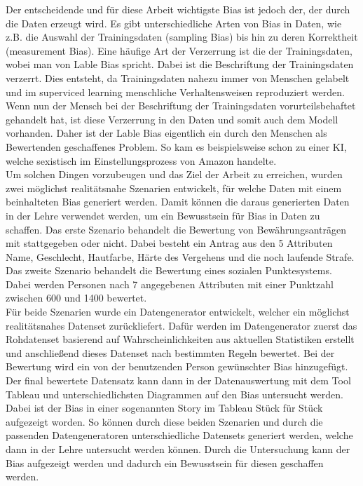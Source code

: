 \begin{onehalfspace}
Der entscheidende und für diese Arbeit wichtigste Bias ist jedoch der, der durch die Daten erzeugt wird. Es gibt unterschiedliche Arten von Bias in Daten, wie z.B. die Auswahl der Trainingsdaten (sampling Bias) bis hin zu deren Korrektheit (measurement Bias). Eine häufige Art der Verzerrung ist die der Trainingsdaten, wobei man von Lable Bias spricht. Dabei ist die Beschriftung der Trainingsdaten verzerrt. Dies entsteht, da Trainingsdaten nahezu immer von Menschen \glqq{}gelabelt\grqq{} und im superviced learning menschliche Verhaltensweisen reproduziert werden. Wenn nun der Mensch bei der Beschriftung der Trainingsdaten vorurteilsbehaftet gehandelt hat, ist diese Verzerrung in den Daten und somit auch dem Modell vorhanden. Daher ist der Lable Bias eigentlich ein durch den Menschen als Bewertenden geschaffenes Problem. So kam es beispielsweise schon zu einer KI, welche sexistisch im Einstellungsprozess von Amazon handelte.\\
Um solchen Dingen vorzubeugen und das Ziel der Arbeit zu erreichen, wurden zwei möglichst realitätsnahe Szenarien entwickelt, für welche Daten mit einem beinhalteten Bias generiert werden. Damit können die daraus generierten Daten in der Lehre verwendet werden, um ein Bewusstsein für Bias in Daten zu schaffen. Das erste Szenario behandelt die Bewertung von Bewährungsanträgen mit stattgegeben oder nicht. Dabei besteht ein Antrag aus den 5 Attributen Name, Geschlecht, Hautfarbe, Härte des Vergehens und die noch laufende Strafe. Das zweite Szenario behandelt die Bewertung eines sozialen Punktesystems. Dabei werden Personen nach 7 angegebenen Attributen mit einer Punktzahl zwischen 600 und 1400 bewertet.\\
Für beide Szenarien wurde ein Datengenerator entwickelt, welcher ein möglichst realitätsnahes Datenset zurückliefert. Dafür werden im Datengenerator zuerst das Rohdatenset basierend auf Wahrscheinlichkeiten aus aktuellen Statistiken erstellt und anschließend dieses Datenset nach bestimmten Regeln bewertet. Bei der Bewertung wird ein von der benutzenden Person gewünschter Bias hinzugefügt. Der final bewertete Datensatz kann dann in der Datenauswertung mit dem Tool Tableau und unterschiedlichsten Diagrammen auf den Bias untersucht werden. Dabei ist der Bias in einer sogenannten Story im Tableau Stück für Stück aufgezeigt worden. So können durch diese beiden Szenarien und durch die passenden Datengeneratoren unterschiedliche Datensets generiert werden, welche dann in der Lehre untersucht werden können. Durch die Untersuchung kann der Bias aufgezeigt werden und dadurch ein Bewusstsein für diesen geschaffen werden.\\\\

\end{onehalfspace}
